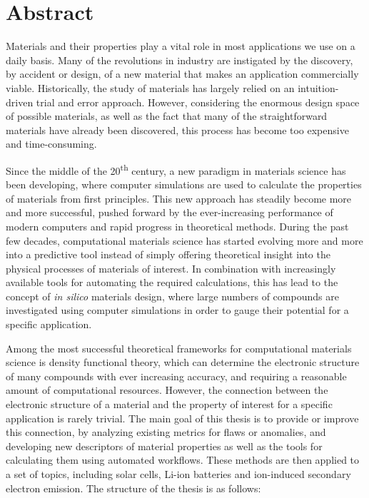 \chapter*{Abstract}

Materials and their properties play a vital role in most applications we use on a daily basis. Many of the revolutions in industry are instigated by the discovery, by accident or design, of a new material that makes an application commercially viable. Historically, the study of materials has largely relied on an intuition-driven trial and error approach. However, considering the enormous design space of possible materials, as well as the fact that many of the straightforward materials have already been discovered, this process has become too expensive and time-consuming. 

Since the middle of the 20\textsuperscript{th} century, a new paradigm in materials science has been developing, where computer simulations are used to calculate the properties of materials from first principles. This new approach has steadily become more and more successful, pushed forward by the ever-increasing performance of modern computers and rapid progress in theoretical methods. During the past few decades, computational materials science has started evolving more and more into a predictive tool instead of simply offering theoretical insight into the physical processes of materials of interest. In combination with increasingly available tools for automating the required calculations, this has lead to the concept of \textit{in silico} materials design, where large numbers of compounds are investigated using computer simulations in order to gauge their potential for a specific application.

Among the most successful theoretical frameworks for computational materials science is density functional theory, which can determine the electronic structure of many compounds with ever increasing accuracy, and requiring a reasonable amount of computational resources. However, the connection between the electronic structure of a material and the property of interest for a specific application is rarely trivial. The main goal of this thesis is to provide or improve this connection, by analyzing existing metrics for flaws or anomalies, and developing new descriptors of material properties as well as the tools for calculating them using automated workflows. These methods are then applied to a set of topics, including solar cells, Li-ion batteries and ion-induced secondary electron emission. The structure of the thesis is as follows:

